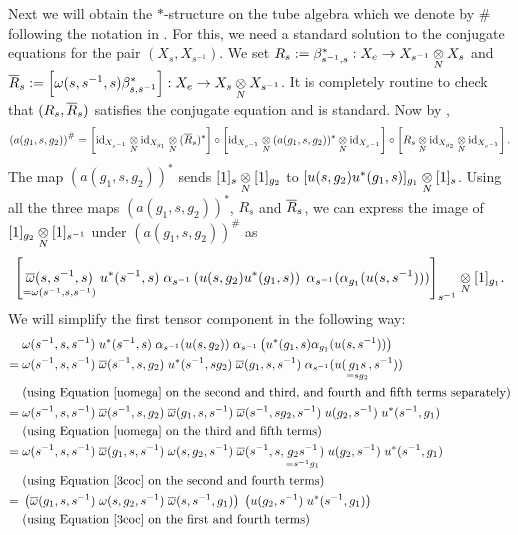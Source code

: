Next we will obtain the $ * $-structure on the tube algebra which we denote by $ \# $ following the notation in \cite{GJ}.
For this, we need a standard solution to the conjugate equations for the pair $ (X_s , X_{s^{-1}}) $.
We set $ R_s := \beta^*_{s^{-1},s} : X_e \rightarrow X_{s^{-1}} \underset{N}{\otimes} X_s$ and $ \overline{R}_s := \left[ \omega (s, s^{-1} , s) \beta^*_{s, s^{-1}} \right] : X_e \rightarrow X_s \underset{N}{\otimes} X_{s^{-1}} $.
It is completely routine to check that $ (R_s , \overline{R}_s) $ satisfies the conjugate equation and is standard.
Now by \cite{GJ},
\[
\left( a(g_1, s , g_2)\right)^\# = \left[\text{id}_{X_{s^{-1}} } \underset{N}{\otimes} \text{id}_{X_{g_1}} \underset{N}{\otimes} (\overline{R}_s)^*\right] \circ \left[\text{id}_{X_{s^{-1}} } \underset{N}{\otimes} (a(g_1,s,g_2))^* \underset{N}{\otimes} \text{id}_{X_{s^{-1}} }\right] \circ \left[R_s \underset{N}{\otimes} \text{id}_{X_{g_2} } \underset{N}{\otimes} \text{id}_{X_{s^{-1}} }\right].
\]
The map $ (a(g_1 , s , g_2))^* $ sends $ [1]_s \underset{N}{\otimes} [1]_{g_2} $ to $ [u(s,g_2) u^* (g_1,s)]_{g_1} \underset{N}{\otimes} [1]_s $.
Using all the three maps $ (a(g_1 , s , g_2))^* $, $ R_s $ and $ \overline{R}_s $, we can express the image of $ [1]_{g_2} \underset{N}{\otimes} [1]_{s^{-1}} $ under $ \left( a(g_1, s , g_2)\right)^\# $ as
\[
\left[ \underset{= \omega (s^{-1} , s , s^{-1})}{\overline{\omega} (s , s^{-1} , s)} \; u^*(s^{-1} , s) \; \alpha_{s^{-1}} \left( u(s,g_2) u^* (g_1 , s) \right) \; \alpha_{s^{-1}} (\alpha_{g_1} (u(s,s^{-1}))) \right]_{s^{-1}} \underset{N}{\otimes} [1]_{g_1}.
\]
We will simplify the first tensor component in the following way:
\begin{align*}
& \; \omega (s^{-1} , s , s^{-1}) \; u^*(s^{-1} , s) \; \alpha_{s^{-1}} ( u(s,g_2) ) \; \alpha_{s^{-1}} \left( u^* (g_1 , s) \alpha_{g_1} (u(s,s^{-1}))\right)\\
= & \; \omega (s^{-1} , s , s^{-1}) \; \overline{\omega} (s^{-1},s,g_2) \; u^* (s^{-1}, sg_2) \; \overline{\omega} (g_1 , s , s^{-1}) \; \alpha_{s^{-1}} (u(\underset{=sg_2}{g_1s} , s^{-1}))\\
& \; \text{(using Equation \ref{uomega} on the second and third, and fourth and fifth terms separately)}\\
= & \; \omega (s^{-1} , s , s^{-1}) \; \overline{\omega} (s^{-1},s,g_2) \; \overline{\omega} (g_1 , s , s^{-1}) \; \overline{\omega} (s^{-1} , s g_2 , s^{-1}) \; u(g_2 , s^{-1}) \; u^* (s^{-1} , g_1)\\
& \; \text{(using Equation \ref{uomega} on the third and fifth terms)}\\
= & \; \omega (s^{-1} , s , s^{-1}) \; \overline{\omega} (g_1 , s , s^{-1}) \; \omega (s, g_2, s^{-1}) \; \overline{\omega} (s^{-1},s, \underset{=s^{-1} g_1}{g_2 s^{-1}}) \; u(g_2 , s^{-1}) \; u^* (s^{-1} , g_1)\\
& \; \text{(using Equation \ref{3coc} on the second and fourth terms)}\\
= & \; \left(\overline{\omega} (g_1 , s , s^{-1}) \; \omega (s, g_2, s^{-1}) \; \overline{\omega} (s , s^{-1}, g_1)\right) \; \left(u(g_2 , s^{-1}) \; u^* (s^{-1} , g_1)\right)\\
& \; \text{(using Equation \ref{3coc} on the first and fourth terms)}
\end{align*}
